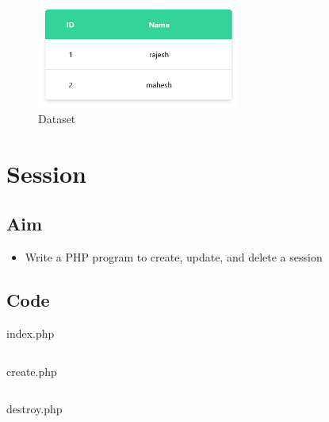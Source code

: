 \documentclass{article}
\begin{document}
\begin{figure}[h!]
	\centering
  \caption{Dataset}
	\includegraphics[width=0.6\textwidth]{./Assets/p2708.png}
\end{figure}
\newpage

\section{Session}
\subsection{Aim}
\begin{itemize}
  \item Write a PHP program to create, update, and delete a session
\end{itemize}

\subsection{Code}
index.php
\inputminted[frame=lines, breaklines, breakanywhere, numberblanklines=false]{html}{./prog_28/index.php}
create.php
\inputminted[frame=lines, breaklines, breakanywhere, numberblanklines=false]{html}{./prog_28/create.php}
destroy.php
\inputminted[frame=lines, breaklines, breakanywhere, numberblanklines=false]{html}{./prog_28/destroy.php}
\end{document}
